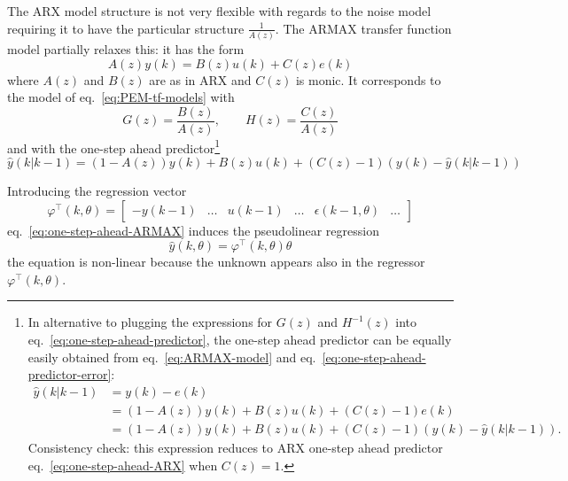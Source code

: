 The ARX model structure is not very flexible with regards to the noise model requiring it to have the particular structure $\frac{1}{A(z)}$. The ARMAX transfer function model partially relaxes this: it has the form
\begin{equation}
  \label{eq:ARMAX-model}
  A(z)y(k) = B(z)u(k) + C(z)e(k)
\end{equation}
where $A(z)$ and $B(z)$ are as in ARX and $C(z)$ is monic. It corresponds to the model of eq.~\eqref{eq:PEM-tf-models} with
\begin{equation*}
  G(z) = \frac{B(z)}{A(z)},\hspace{2em} H(z) = \frac{C(z)}{A(z)}
\end{equation*}
and with the one-step ahead predictor\footnote{In alternative to plugging the expressions for $G(z)$ and $H^{-1}(z)$ into eq.~\eqref{eq:one-step-ahead-predictor}, the one-step ahead predictor can be equally easily obtained from eq.~\eqref{eq:ARMAX-model} and eq.~\eqref{eq:one-step-ahead-predictor-error}:
  \begin{align*}
    \hat{y}(k|k-1) &= y(k) - e(k) \\
                   &=\left(1-A(z)\right)y(k) + B(z)u(k) + \left(C(z)-1\right)e(k) \\
                   &= \left(1-A(z)\right)y(k) + B(z)u(k) + \left(C(z)-1\right)\left(y(k)-\hat{y}(k|k-1)\right).
  \end{align*}
  Consistency check: this expression reduces to ARX one-step ahead predictor eq.~\eqref{eq:one-step-ahead-ARX} when $C(z)=1$.}
\begin{equation}
  \label{eq:one-step-ahead-ARMAX}
  \hat{y}(k|k-1) = (1-A(z))y(k) + B(z)u(k) + (C(z)-1)\left(y(k)-\hat{y}(k|k-1)\right)
\end{equation}

Introducing the regression vector
\begin{equation*}
  \varphi^\top(k,\theta) =
  \begin{bmatrix}
    -y(k-1) & \ldots & u(k-1) & \ldots & \epsilon(k-1,\theta) & \ldots
  \end{bmatrix}
\end{equation*}
eq.~\eqref{eq:one-step-ahead-ARMAX} induces the pseudolinear regression
\begin{equation}
  \label{eq:pseudolinear-regression-ARMAX}
  \hat{y}(k,\theta) = \varphi^\top(k,\theta) \theta
\end{equation}
the equation is non-linear because the unknown appears also in the regressor $\varphi^\top(k,\theta)$.

